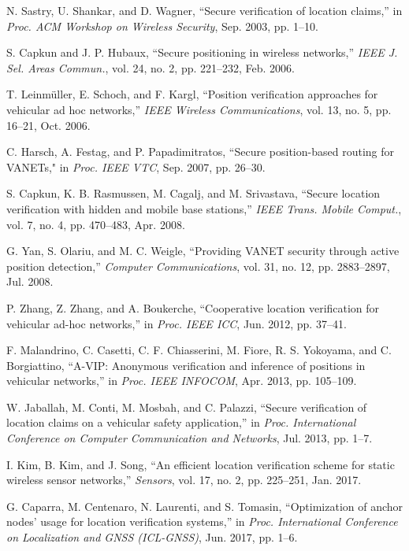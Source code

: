 \documentclass[journal]{IEEEtran}
\begin{document}
\begin{thebibliography}{1}
 N. Sastry, U. Shankar, and D. Wagner, ``Secure verification of location claims,'' in \textit{Proc. ACM Workshop on Wireless Security}, Sep. 2003, pp. 1--10.

 S. Capkun and J. P. Hubaux, ``Secure positioning in wireless networks,'' \textit{IEEE J. Sel. Areas Commun.}, vol. 24, no. 2, pp. 221--232, Feb. 2006.

 T. Leinm\"{u}ller, E. Schoch, and F. Kargl, ``Position verification approaches for vehicular ad hoc networks,'' \textit{IEEE Wireless Communications}, vol. 13, no. 5, pp. 16--21, Oct. 2006.

	C. Harsch, A. Festag, and P. Papadimitratos, ``Secure position-based routing for VANETs," in \textit{Proc. IEEE VTC}, Sep. 2007, pp. 26--30.

	S. Capkun, K. B. Rasmussen, M. Cagalj, and M. Srivastava, ``Secure location verification with hidden and mobile base stations,'' \textit{IEEE Trans. Mobile Comput.}, vol. 7, no. 4, pp. 470--483, Apr. 2008.

 G. Yan, S. Olariu, and M. C. Weigle, ``Providing VANET security through active position detection,'' \textit{Computer Communications}, vol. 31, no. 12, pp. 2883--2897, Jul. 2008.

 P. Zhang, Z. Zhang, and A. Boukerche, ``Cooperative location verification for vehicular ad-hoc networks,'' in \textit{Proc. IEEE ICC}, Jun. 2012, pp. 37--41.

 F. Malandrino, C. Casetti, C. F. Chiasserini, M. Fiore, R. S. Yokoyama, and C. Borgiattino, ``A-VIP: Anonymous verification and inference of positions in vehicular networks,'' in \textit{Proc. IEEE INFOCOM}, Apr. 2013, pp. 105--109.

 W. Jaballah, M. Conti, M. Mosbah, and C. Palazzi, ``Secure verification of location claims on a vehicular safety application,'' in \textit{Proc. International Conference on Computer Communication and Networks}, Jul. 2013, pp. 1--7.

 I. Kim, B. Kim, and J. Song, ``An efficient location verification scheme for static wireless sensor networks,'' \textit{Sensors}, vol. 17, no. 2, pp. 225--251, Jan. 2017.

 G. Caparra, M. Centenaro, N. Laurenti, and S. Tomasin, ``Optimization of anchor nodes' usage for location verification systems,'' in \textit{Proc. International Conference on Localization and GNSS (ICL-GNSS)}, Jun. 2017, pp. 1--6.


\end{thebibliography}
\end{document}

